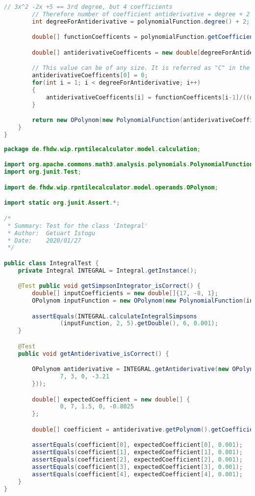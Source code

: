 \begin{lstlisting}[caption=Integral (Istogu),label=list:Integral,language=Java]
        // 3x^2 -2x +5 == 3rd degree, but 4 coefficients
        // Therefore number of coefficient antiderivative = degree + 2
        int degreeForAntiderivative = polynomialFunction.degree() + 2;

        double[] functionCoefficents = polynomialFunction.getCoefficients();

        double[] antiderivativeCoefficents = new double[degreeForAntiderivative];

        // This value can be of any size. It is referred as "C" in the literature.
        antiderivativeCoefficents[0] = 0;
        for(int i = 1; i < degreeForAntiderivative; i++)
        {
            antiderivativeCoefficents[i] = functionCoefficents[i-1]/((double) i);
        }

        return new OPolynom(new PolynomialFunction(antiderivativeCoefficents));
    }
}
\end{lstlisting}    

\begin{lstlisting}[caption=IntegralTest (Istogu),label=list:IntegralTest,language=Java]
package de.fhdw.wip.rpntilecalculator.model.calculation;

import org.apache.commons.math3.analysis.polynomials.PolynomialFunction;
import org.junit.Test;

import de.fhdw.wip.rpntilecalculator.model.operands.OPolynom;

import static org.junit.Assert.*;

/*
 * Summary: Test for the class 'Integral'
 * Author:  Getuart Istogu
 * Date:    2020/01/27
 */

public class IntegralTest {
    private Integral INTEGRAL = Integral.getInstance();

    @Test public void getSimpsonIntegrator_isCorrect() {
        double[] inputCoefficients = new double[]{17, -8, 1};
        OPolynom inputFunction = new OPolynom(new PolynomialFunction(inputCoefficients));

        assertEquals(INTEGRAL.calculateIntegralSimpsons
                (inputFunction, 2, 5).getDouble(), 6, 0.001);
    }

    @Test
    public void getAntiderivative_isCorrect() {

        OPolynom antiderivative = INTEGRAL.getAntiderivative(new OPolynom(new double[] {
                7, 3, 0, -3.21
        }));

        double[] expectedCoefficient = new double[] {
                0, 7, 1.5, 0, -0.8025
        };

        double[] coefficient = antiderivative.getPolynom().getCoefficients();

        assertEquals(coefficient[0], expectedCoefficient[0], 0.001);
        assertEquals(coefficient[1], expectedCoefficient[1], 0.001);
        assertEquals(coefficient[2], expectedCoefficient[2], 0.001);
        assertEquals(coefficient[3], expectedCoefficient[3], 0.001);
        assertEquals(coefficient[4], expectedCoefficient[4], 0.001);
    }
}
\end{lstlisting}    

